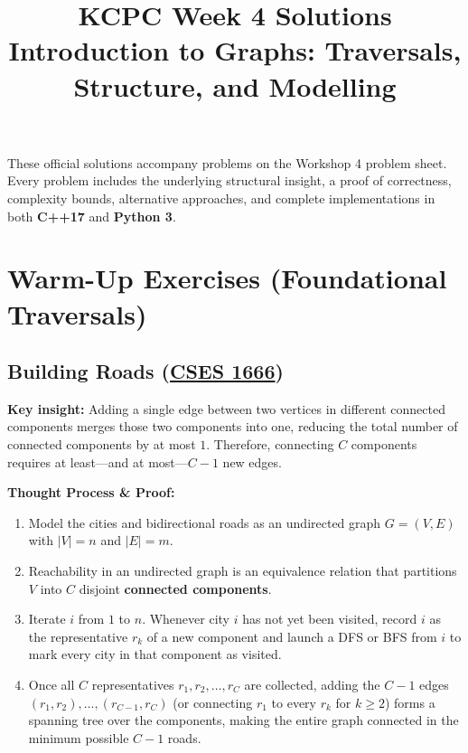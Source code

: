 \documentclass[11pt]{article}
\title{KCPC Week 4 Solutions\\Introduction to Graphs: Traversals, Structure, and Modelling}
\author{}
\date{}
\newcommand{\insight}[1]{\par\medskip\noindent\textbf{Key insight:} #1\par\smallskip}
\begin{document}
\maketitle
\thispagestyle{fancy}

\noindent
These official solutions accompany problems on the Workshop 4 problem sheet. Every problem includes the underlying structural insight, a proof of correctness, complexity bounds, alternative approaches, and complete implementations in both \textbf{C++17} and \textbf{Python 3}.

\section{Warm-Up Exercises (Foundational Traversals)}

\subsection{Building Roads (\href{https://cses.fi/problemset/task/1666}{CSES 1666})}

\insight{Adding a single edge between two vertices in different connected components merges those two components into one, reducing the total number of connected components by at most $1$. Therefore, connecting $C$ components requires at least---and at most---$C - 1$ new edges.}

\textbf{Thought Process \& Proof:}
\begin{enumerate}
    \item Model the cities and bidirectional roads as an undirected graph $G = (V, E)$ with $|V| = n$ and $|E| = m$.
    \item Reachability in an undirected graph is an equivalence relation that partitions $V$ into $C$ disjoint \textbf{connected components}.
    \item Iterate $i$ from $1$ to $n$. Whenever city $i$ has not yet been visited, record $i$ as the representative $r_k$ of a new component and launch a DFS or BFS from $i$ to mark every city in that component as visited.
    \item Once all $C$ representatives $r_1, r_2, \dots, r_C$ are collected, adding the $C - 1$ edges $(r_1, r_2), \dots, (r_{C-1}, r_C)$ (or connecting $r_1$ to every $r_k$ for $k \ge 2$) forms a spanning tree over the components, making the entire graph connected in the minimum possible $C - 1$ roads.
\end{enumerate}
\end{document}
